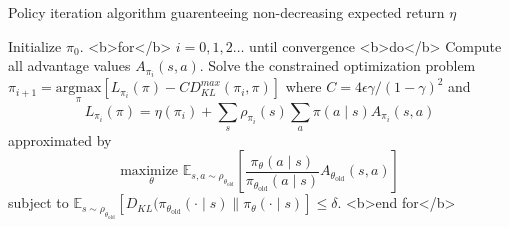 Policy iteration algorithm guarenteeing non-decreasing expected return \( \eta \)

Initialize \( \pi_0 \).
<b>for</b> \( i = 0, 1, 2 \ldots \) until convergence <b>do</b>
	Compute all advantage values \( A_{\pi_i}(s, a) \).
	Solve the constrained optimization problem
	\( \pi_{i+1} = \underset{\pi}{\text{argmax}}[L_{\pi_i}(\pi) - CD_{KL}^{max}(\pi_i, \pi)] \)
		where \( C = 4\epsilon\gamma / (1 - \gamma)^2 \)
		and \[ L_{\pi_i}(\pi) = \eta(\pi_i) + \underset{s}{\sum}{\rho_{\pi_i}(s)\underset{a}{\sum}{\pi(a \mid s)A_{\pi_i}(s, a)}} \]
	approximated by
	\[ \underset{\theta}{\text{maximize }}{\mathbb{E}_{s,a \sim \rho_{\theta_\text{old}}}\left[ \frac{\pi_\theta(a \mid s)}{\pi_{\theta_\text{old}}(a \mid s)} A_{\theta_\text{old}}(s, a) \right]} \]
		subject to \( \mathbb{E}_{s \sim \rho_{\theta_\text{old}}}[D_{KL}(\pi_{\theta_\text{old}}(\cdot \mid s) \| \pi_\theta(\cdot \mid s)] \leq \delta \).
<b>end for</b>
